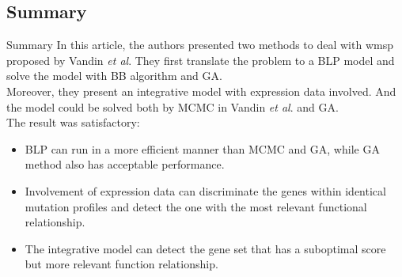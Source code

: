 \documentclass[xcolor=dvipsnames]{beamer}
\begin{document}
\subsection{Summary}
\begin{frame}{Summary}
In this article, the authors presented two methods to deal with wmsp proposed by Vandin {\em et al}. They first translate the problem to a BLP model and solve the model with BB algorithm and GA.\\
Moreover, they present an integrative model with expression data involved. And the model could be solved both by MCMC in Vandin {\em et al}. and GA.\\
The result was satisfactory:
\begin{itemize}
\item BLP can run in a more efficient manner than MCMC and GA, while GA method also has acceptable performance.\\
\item Involvement of expression data can discriminate the genes within identical mutation profiles and detect the one with the most relevant functional relationship.\\
    \item The integrative model can detect the gene set that has a suboptimal score but more relevant function relationship.\\
    \end{itemize}
\end{frame}
\end{document}
